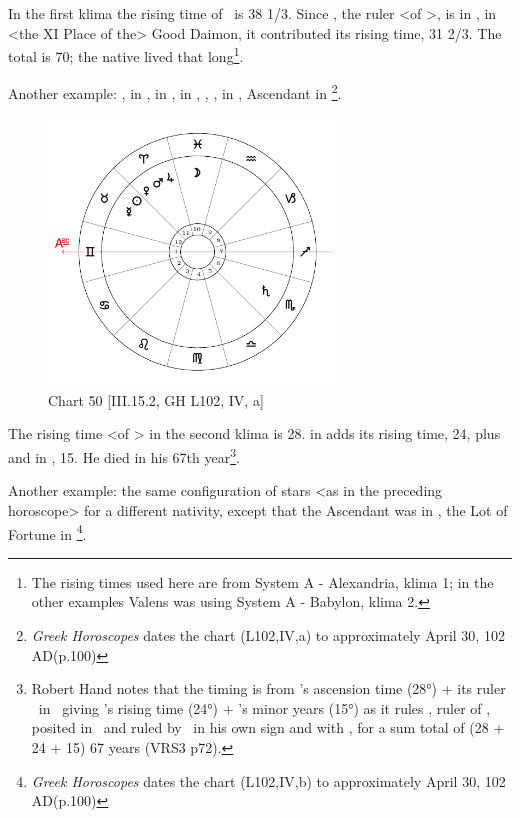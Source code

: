 In the first klima the rising time of \Virgo\, is 38 1/3. Since \Mercury, the ruler <of \Virgo>, is in \Cancer, in <the XI Place of the> Good Daimon, it contributed its rising time, 31 2/3. The total is 70; the native lived that long\footnote{The rising times used here are from System A - Alexandria, klima 1; in the other examples Valens was using System A - Babylon, klima 2.}.

\newpage
Another example: \Sun, \Mercury\xspace in \Taurus, \Moon\xspace in \Pisces, \Saturn\xspace in \Scorpio, \Jupiter, \Mars, \Venus in \Aries, Ascendant in \Gemini
\footnote{\textit{Greek Horoscopes} dates the chart (L102,IV,a) to approximately April 30, 102 AD(p.100)}.

\clearpage
\begin{figure}
\centering
\vspace{-20pt}
\includegraphics[width=0.68\textwidth]{charts/3_15_2}
\caption{Chart 50 [III.15.2, GH L102, IV, a]}
\label{fig:chart50}
\end{figure} 

The rising time <of \Gemini> in the second klima is 28. \Mercury\xspace in \Taurus\xspace adds its rising time, 24, plus \Mars\xspace and \Venus\xspace in \Aries, 15. He died in his 67th year\footnote{Robert Hand notes that the timing is from \Gemini's ascension time (28°) + its ruler \Mercury\, in \Taurus\, giving \Taurus's rising time (24°) + \Mars's minor years (15°) as it rules \Venus, ruler of \Taurus, posited in \Aries\, and ruled by \Mars\, in his own sign and with \Venus, for a sum total of (28 + 24 + 15) 67 years (VRS3 p72). }.

\newpage
Another example: the same configuration of stars <as in the preceding horoscope> for a different nativity, except that the Ascendant was in \Capricorn, the Lot of Fortune in \Pisces
\footnote{\textit{Greek Horoscopes} dates the chart (L102,IV,b) to approximately April 30, 102 AD(p.100)}.

